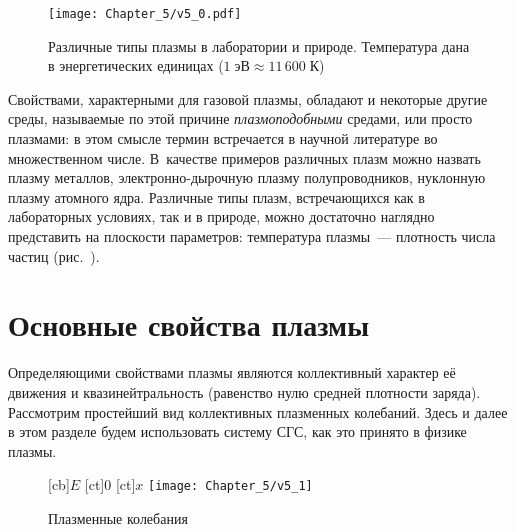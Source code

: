 \begin{figure}[t]
    \centering
	\texttt{[image: Chapter\_5/v5\_0.pdf]}
	\caption{Различные типы плазмы в лаборатории и природе. Температура
    дана в энергетических единицах ($1\;эВ\approx 11\,600\;К$)}
\end{figure}

Свойствами, характерными для газовой плазмы, обладают и некоторые другие среды,
называемые по этой причине
\emph{плазмоподобными} средами, или просто плазмами: в этом смысле термин
 встречается в научной литературе во множественном числе.
В~качестве примеров различных плазм можно назвать плазму металлов,
электронно-дырочную плазму полупроводников, нуклонную плазму атомного ядра.
Различные типы плазм, встречающихся как в лабораторных условиях,
так и в природе, можно достаточно наглядно представить на плоскости параметров:
температура плазмы~--- плотность числа частиц (рис.~).

\section{Основные свойства плазмы}

Определяющими свойствами плазмы являются коллективный характер её движения
и квазинейтральность (равенство нулю средней плотности заряда).
Рассмотрим простейший вид коллективных плазменных колебаний. Здесь и далее
в этом разделе будем использовать систему СГС, как это принято в физике плазмы.

\begin{figure}[h!]
    [cb]{$E$}
    [ct]{0}
    [ct]{$x$}
    \centering
    \texttt{[image: Chapter\_5/v5\_1]}
    \caption{Плазменные колебания}
\end{figure}

